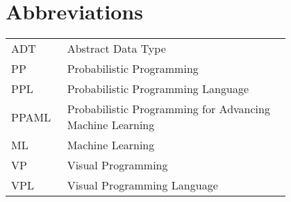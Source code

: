 \chapter*{Abbreviations}

\begin{flushleft}
\begin{tabular}{l p{0.8\linewidth}}
ADT      & Abstract Data Type\\
PP       & Probabilistic Programming\\
PPL      & Probabilistic Programming Language\\
PPAML    & Probabilistic Programming for Advancing Machine Learning\\
ML       & Machine Learning\\
VP       & Visual Programming\\
VPL      & Visual Programming Language
\end{tabular}
\end{flushleft}
